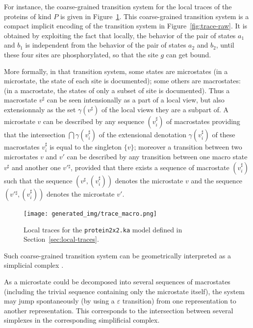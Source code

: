 \documentclass[11pt]{book}
\def\ttt#1{\texttt{#1}}
\begin{document}
For instance, the coarse-grained transition system for the local traces of the proteins of kind $P$ is given in Figure~\ref{fig:trace-macro}.  This  coarse-grained transition system is a compact implicit encoding of the transition system in Figure~\ref{fig:trace-raw}. It is obtained by exploiting the fact that locally, the behavior of the pair of states $a_1$ and $b_1$ is independent from the behavior of the pair of states $a_2$ and $b_2$, until these four sites are phosphorylated, so that the site $g$ can get bound.


More formally, in that transition system, some states are microstates (in a microstate, the state of each site is documented); some others are macrostates: (in a macrostate, the states of only a subset of site is documented).
Thus a macrostate $v^{\sharp}$ can be seen intensionally as a part  of a local view, but also extensionnaly as the set $\gamma(v^{\sharp})$ of the local views they are a subpart of. A microstate $v$ can be described by any sequence $(v_i^{\sharp})$ of macrostates providing that the intersection $\bigcap \gamma(v^{\sharp}_i)$ of the extensional denotation $\gamma(v^{\sharp}_i)$ of these macrostates $v^{\sharp}_i$ is equal to the singleton $\{v\}$;
moreover a transition between two microstates $v$ and $v'$ can be described by any transition between one macro state $v^{\sharp}$ and another one $v'{}^{\sharp}$, provided that there exists a sequence of macrostate $(v^{\sharp}_i)$ such that the sequence $(v^{\sharp},(v^{\sharp}_i))$ denotes the microstate $v$ and the sequence $(v'{}^{\sharp},(v^{\sharp}_i))$ denotes the microstate $v'$.

\begin{figure}[htbp]
\centering
\texttt{[image: generated\_img/trace\_macro.png]}
\caption{Local traces for the \ttt{protein2x2.ka} model defined in Section~\ref{sec:local-traces}.}
\label{fig:trace-macro}
\end{figure}

Such coarse-grained transition system can be geometrically interpreted as a simplicial complex \cite{DBLP:conf/concur/FajstrupGR98}.

As a microstate could be decomposed into several sequences of macrostates (including the trivial sequence containing only the microstate itself), the system may jump spontaneously (by using a $\varepsilon$ transition) from one representation to another representation. This corresponds to the intersection between several simplexes in the corresponding simplificial complex.
\end{document}
